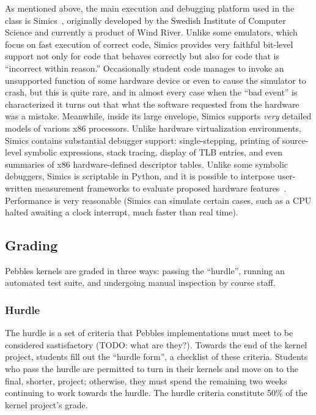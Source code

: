 As mentioned above, the main execution and debugging
platform used in the class is
Simics~\cite{simics},
originally developed by the Swedish Institute of
Computer Science and
currently a product of Wind River.
Unlike some emulators,
which focus on fast execution of correct code,
Simics
provides very faithful bit-level support
not only for code that behaves correctly but
also for code that is ``incorrect within reason.''
Occasionally student code manages to invoke an unsupported
function of some hardware device or even to cause the
simulator to crash, but this is quite rare, and in almost
every case when the ``bad event'' is characterized it turns
out that what the software requested from the hardware was
a mistake.
Meanwhile, inside its large envelope, Simics supports
\textit{very} detailed models of various x86 processors.
Unlike hardware virtualization environments,
Simics contains substantial debugger support:
single-stepping,
printing of source-level symbolic
expressions,
stack tracing,
display of TLB entries,
and even summaries of x86 hardware-defined descriptor tables.
Unlike some symbolic debuggers,
Simics is scriptable in Python,
and it is possible to interpose user-written measurement
frameworks to evaluate proposed hardware
features~\cite{UW-GEMS,SimFlex,FeS2}.
Performance is very reasonable (Simics can simulate certain
cases, such as a CPU halted awaiting a clock interrupt,
much faster than real time).


\subsection{Grading}

Pebbles kernels are graded in three ways: passing the ``hurdle'', running an automated test suite, and undergoing manual inspection by course staff.

\subsubsection{Hurdle}
The hurdle is a set of criteria that Pebbles implementations must meet to be considered sastisfactory
(TODO: what are they?).
Towards the end of the kernel project, students fill out the ``hurdle form'', a checklist of these criteria.
Students who pass the hurdle are permitted to turn in their kernels and move on to the final, shorter, project; otherwise, they must spend the remaining two weeks continuing to work towards the hurdle.
The hurdle criteria constitute 50\% of the kernel project's grade.

